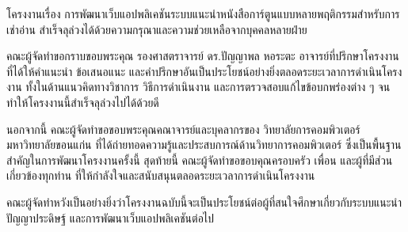 %

โครงงานเรื่อง การพัฒนาเว็บแอปพลิเคชันระบบแนะนำหนังสือการ์ตูนแบบหลายพฤติกรรมสำหรับการเช่าอ่าน สำเร็จลุล่วงได้ด้วยความกรุณาและความช่วยเหลือจากบุคคลหลายฝ่าย

คณะผู้จัดทำขอกราบขอบพระคุณ รองศาสตราจารย์ ดร.ปัญญาพล หอระตะ อาจารย์ที่ปรึกษาโครงงาน ที่ได้ให้คำแนะนำ ข้อเสนอแนะ และคำปรึกษาอันเป็นประโยชน์อย่างยิ่งตลอดระยะเวลาการดำเนินโครงงาน ทั้งในด้านแนวคิดทางวิชาการ วิธีการดำเนินงาน และการตรวจสอบแก้ไขข้อบกพร่องต่าง ๆ จนทำให้โครงงานนี้สำเร็จลุล่วงไปได้ด้วยดี

นอกจากนี้ คณะผู้จัดทำขอขอบพระคุณคณาจารย์และบุคลากรของ วิทยาลัยการคอมพิวเตอร์ มหาวิทยาลัยขอนแก่น ที่ได้ถ่ายทอดความรู้และประสบการณ์ด้านวิทยาการคอมพิวเตอร์ ซึ่งเป็นพื้นฐานสำคัญในการพัฒนาโครงงานครั้งนี้
สุดท้ายนี้ คณะผู้จัดทำขอขอบคุณครอบครัว เพื่อน และผู้ที่มีส่วนเกี่ยวข้องทุกท่าน ที่ให้กำลังใจและสนับสนุนตลอดระยะเวลาการดำเนินโครงงาน

คณะผู้จัดทำหวังเป็นอย่างยิ่งว่าโครงงานฉบับนี้จะเป็นประโยชน์ต่อผู้ที่สนใจศึกษาเกี่ยวกับระบบแนะนำ ปัญญาประดิษฐ์ และการพัฒนาเว็บแอปพลิเคชันต่อไป

